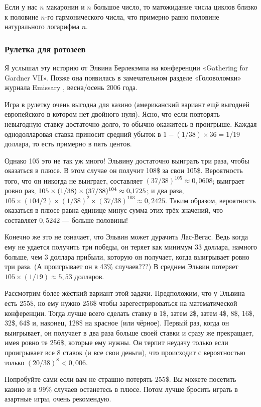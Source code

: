 Если у нас $n$ макаронин и $n$ большое число, то матожидание числа циклов близко к половине $n$-го гармонического числа, что примерно равно половине натурального логарифма $n$.

\subsubsection*{Рулетка для ротозеев}

Я услышал эту историю от Элвина Берлекэмпа на конференции
«Gathering for Gardner VII».
Позже она появилась в замечательном разделе «Головоломки» журнала Emissary \cite{berlekamp-buhle}, весна/осень 2006 года.

Игра в рулетку очень выгодна для казино (американский вариант ещё выгодней европейского в котором нет двойного нуля).
Ясно, что если повторять невыгодную ставку достаточно долго, то обычно окажитесь в проигрыше.
Каждая однодолларовая ставка приносит средний убыток в  $1 - (1/38) \times 36 = 1/19$ доллара, то есть примерно в пять центов.

Однако 105 это не так уж много!
Эльвину достаточно выиграть три раза, чтобы оказаться в плюсе.
В этом случае он получит 108\$ за свои 105\$.
Вероятность того, что он никогда не выиграет, составляет $(37/38)^{105} \approx 0{,}0608$;
выиграет ровно раз, $105 \times (1/38) \times (37/38)^{104} \z\approx 0{,}1725$;
и два раза, $105 \times (104/2) \times (1/38)^2 \times (37/38)^{103} \approx 0{,}2425$.
Таким образом, вероятность оказаться в плюсе равна единице минус сумма этих трёх значений, что составляет $0{,}5242$ --- больше половины!

Конечно же это не означает, что Эльвин может дурачить Лас-Вегас.
Ведь когда ему не удается получить три победы, он теряет как минимум 33 доллара, намного больше, чем 3 доллара прибыли, которую он получает, когда выигрывает ровно три раза.
(А проигрывает он в 43\% случаев???)
В среднем Эльвин потеряет $105 \times (1/19) \approx 5{,}53$ долларов.

Рассмотрим более жёсткий вариант этой задачи.
Предположим, что у Эльвина есть 255\$, но ему нужно 256\$ чтобы зарегестрироваться на математической конференции.
Тогда лучше всего сделать ставку в 1\$, затем 2\$, затем 4\$, 8\$, 16\$, 32\$, 64\$ и, наконец, 128\$ на красное (или чёрное).
Первый раз, когда он выигрывает, он получает в два раза больше своей ставки и сразу же прекращает, имея ровно те 256\$, которые ему нужны.
Он терпит неудачу только если проигрывает все 8 ставок (и все свои деньги), что происходит с вероятностью только $(20/38)^8 < 0{,}006$.

Попробуйте сами если вам не страшно потерять 255\$.
Вы можете посетить казино и в 99\% случаев останетесь в плюсе.
Потом лучше бросить играть в азартные игры, очень рекомендую.
